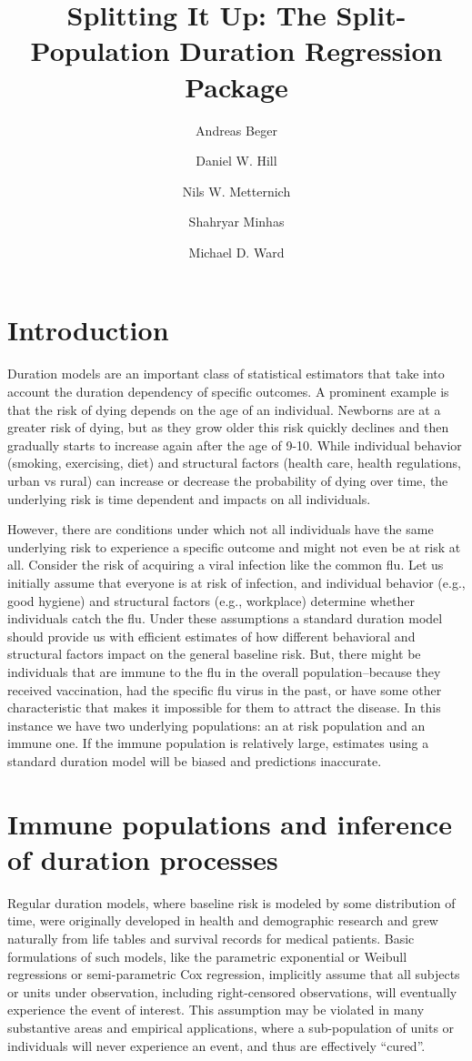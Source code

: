 \documentclass[12pt,onesided]{amsart}
\title{Splitting It Up: The \pkg{spduration} Split-Population Duration
Regression Package}
\author[Beger]{Andreas Beger}
\author[Hill]{Daniel W. Hill}
\author[Metternich]{Nils W. Metternich}
\author[Minhas]{Shahryar Minhas}
\author[Ward]{Michael D. Ward}
\begin{document}
\maketitle

\section{Introduction}

Duration models are an important class of statistical estimators that
take into account the duration dependency of specific outcomes. A
prominent example is that the risk of dying depends on the age of an
individual. Newborns are at a greater risk of dying, but as they grow
older this risk quickly declines and then gradually starts to increase
again after the age of 9-10. While individual behavior (smoking,
exercising, diet) and structural factors (health care, health
regulations, urban vs rural) can increase or decrease the probability of
dying over time, the underlying risk is time dependent and impacts on
all individuals.

However, there are conditions under which not all individuals have the
same underlying risk to experience a specific outcome and might not even
be at risk at all. Consider the risk of acquiring a viral infection like
the common flu. Let us initially assume that everyone is at risk of
infection, and individual behavior (e.g., good hygiene) and structural
factors (e.g., workplace) determine whether individuals catch the flu.
Under these assumptions a standard duration model should provide us with
efficient estimates of how different behavioral and structural factors
impact on the general baseline risk. But, there might be individuals
that are immune to the flu in the overall population--because they
received vaccination, had the specific flu virus in the past, or have
some other characteristic that makes it impossible for them to attract
the disease. In this instance we have two underlying populations: an at
risk population and an immune one. If the immune population is
relatively large, estimates using a standard duration model will be
biased and predictions inaccurate.

\section{Immune populations and inference of duration
processes}

Regular duration models, where baseline risk is modeled by some
distribution of time, were originally developed in health and
demographic research and grew naturally from life tables and survival
records for medical patients. Basic formulations of such models, like
the parametric exponential or Weibull regressions or semi-parametric Cox
regression, implicitly assume that all subjects or units under
observation, including right-censored observations, will eventually
experience the event of interest. This assumption may be violated in
many substantive areas and empirical applications, where a
sub-population of units or individuals will never experience an event,
and thus are effectively ``cured''.
\end{document}

